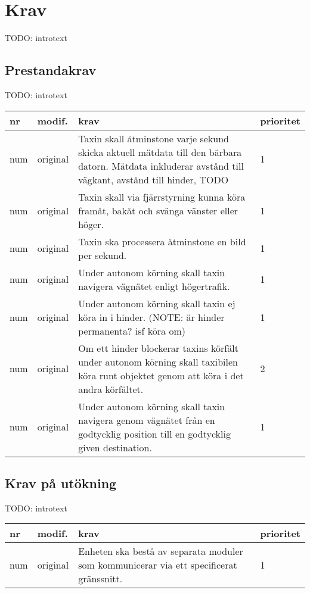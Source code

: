 \documentclass[kravspec/krav.tex]{subfiles}
\newenvironment{reqlist}
{
    \begin{tabular}{|l|l|p{10cm}|l|}
    \hline
    \bfseries nr &
    \bfseries modif. &
    \bfseries krav &
    \bfseries prioritet \\
}{
    \hline
    \end{tabular}
}
\newcommand{\req}[3]{
    \hline
    num & #1 & #3 & #2 \\
}
\begin{document}
\section{Krav}
TODO: introtext

\subsection{Prestandakrav}
TODO: introtext
\begin{reqlist}
\req{original}{1}{
    Taxin skall åtminstone varje sekund skicka aktuell mätdata till den bärbara
    datorn. Mätdata inkluderar avstånd till vägkant, avstånd till hinder, TODO
}
\req{original}{1}{
    Taxin skall via fjärrstyrning kunna köra framåt, bakåt och svänga vänster
    eller höger.
}
\req{original}{1}{
    Taxin ska processera åtminstone en bild per sekund.
}
\req{original}{1}{
    Under autonom körning skall taxin navigera vägnätet enligt högertrafik.
}
\req{original}{1}{
    Under autonom körning skall taxin ej köra in i hinder. (NOTE: är hinder
    permanenta? isf köra om)
}
\req{original}{2}{
    Om ett hinder blockerar taxins körfält under autonom körning skall
    taxibilen köra runt objektet genom att köra i det andra körfältet.
}
\req{original}{1}{
    Under autonom körning skall taxin navigera genom vägnätet från en
    godtycklig position till en godtycklig given destination.
}
\end{reqlist}

\subsection{Krav på utökning}
TODO: introtext

\begin{reqlist}
\req{original}{1}{
    Enheten ska bestå av separata moduler som kommunicerar via ett specificerat
    gränssnitt.
}
\end{reqlist}
\end{document}
